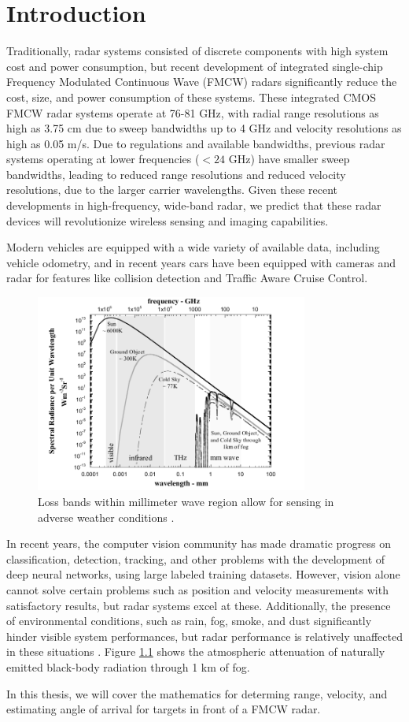 \chapter{Introduction}
Traditionally, radar systems consisted of discrete components with high system
cost and power consumption, but recent development of integrated single-chip
Frequency Modulated Continuous Wave (FMCW) radars significantly reduce the cost,
size, and power consumption of these systems. These
integrated CMOS FMCW radar systems operate at 76-81 GHz, with radial range resolutions
as high as 3.75 cm due to sweep bandwidths up to 4 GHz and velocity resolutions
as high as 0.05 m/s. Due to regulations and available bandwidths,
previous radar systems operating at lower frequencies ($<24$ GHz) have smaller
sweep bandwidths, leading to reduced range resolutions and reduced velocity
resolutions, due to the larger carrier wavelengths. Given these recent developments in
high-frequency, wide-band radar, we predict that these radar devices will
revolutionize wireless sensing and imaging capabilities. 

Modern vehicles are equipped with a wide variety of available data, including
vehicle odometry, and in recent years cars have been equipped with cameras and
radar for features like collision detection and Traffic Aware Cruise Control.

\begin{figure}[h]
	\centering
	\includegraphics[width=0.8\textwidth]{imgs/attenuation}
	\caption{Loss bands within millimeter wave region allow for sensing in
	adverse weather conditions \cite{patel2016computational}.}
	\label{fig:attentuation}
\end{figure}

In recent years, the computer vision community has made dramatic progress on classification,
detection, tracking, and other problems with the development of deep neural
networks, using large labeled training datasets. However, vision alone cannot
solve certain problems such as position and velocity measurements with
satisfactory results, but radar systems excel at these. Additionally, the
presence of environmental conditions, such as rain, fog, smoke, and dust
significantly hinder visible system performances, but radar performance is
relatively unaffected in these situations \cite{patel2016computational}. Figure \ref{fig:attentuation} shows the atmospheric
attenuation of naturally emitted black-body radiation through 1 km of fog. 

In this thesis, we will cover the mathematics for determing range, velocity, and
estimating angle of arrival for targets in front of a FMCW radar. 
